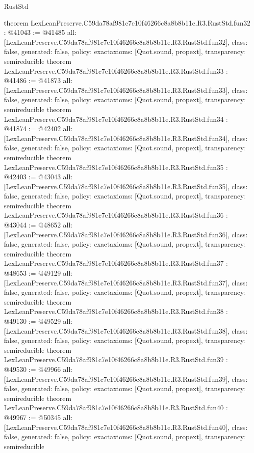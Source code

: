 \begin{lexlean}{RustStd}
\begin{coremodule}
{}
theorem LexLeanPreserve.C59da78af981c7e10f46266c8a8b8b11e.R3.RustStd.fun32 : @41043 := @41485 {
  all: [LexLeanPreserve.C59da78af981c7e10f46266c8a8b8b11e.R3.RustStd.fun32],
  class: false,
  generated: false,
  policy: exact{axioms: [Quot.sound, propext]},
  transparency: semireducible
}
theorem LexLeanPreserve.C59da78af981c7e10f46266c8a8b8b11e.R3.RustStd.fun33 : @41486 := @41873 {
  all: [LexLeanPreserve.C59da78af981c7e10f46266c8a8b8b11e.R3.RustStd.fun33],
  class: false,
  generated: false,
  policy: exact{axioms: [Quot.sound, propext]},
  transparency: semireducible
}
theorem LexLeanPreserve.C59da78af981c7e10f46266c8a8b8b11e.R3.RustStd.fun34 : @41874 := @42402 {
  all: [LexLeanPreserve.C59da78af981c7e10f46266c8a8b8b11e.R3.RustStd.fun34],
  class: false,
  generated: false,
  policy: exact{axioms: [Quot.sound, propext]},
  transparency: semireducible
}
theorem LexLeanPreserve.C59da78af981c7e10f46266c8a8b8b11e.R3.RustStd.fun35 : @42403 := @43043 {
  all: [LexLeanPreserve.C59da78af981c7e10f46266c8a8b8b11e.R3.RustStd.fun35],
  class: false,
  generated: false,
  policy: exact{axioms: [Quot.sound, propext]},
  transparency: semireducible
}
theorem LexLeanPreserve.C59da78af981c7e10f46266c8a8b8b11e.R3.RustStd.fun36 : @43044 := @48652 {
  all: [LexLeanPreserve.C59da78af981c7e10f46266c8a8b8b11e.R3.RustStd.fun36],
  class: false,
  generated: false,
  policy: exact{axioms: [Quot.sound, propext]},
  transparency: semireducible
}
theorem LexLeanPreserve.C59da78af981c7e10f46266c8a8b8b11e.R3.RustStd.fun37 : @48653 := @49129 {
  all: [LexLeanPreserve.C59da78af981c7e10f46266c8a8b8b11e.R3.RustStd.fun37],
  class: false,
  generated: false,
  policy: exact{axioms: [Quot.sound, propext]},
  transparency: semireducible
}
theorem LexLeanPreserve.C59da78af981c7e10f46266c8a8b8b11e.R3.RustStd.fun38 : @49130 := @49529 {
  all: [LexLeanPreserve.C59da78af981c7e10f46266c8a8b8b11e.R3.RustStd.fun38],
  class: false,
  generated: false,
  policy: exact{axioms: [Quot.sound, propext]},
  transparency: semireducible
}
theorem LexLeanPreserve.C59da78af981c7e10f46266c8a8b8b11e.R3.RustStd.fun39 : @49530 := @49966 {
  all: [LexLeanPreserve.C59da78af981c7e10f46266c8a8b8b11e.R3.RustStd.fun39],
  class: false,
  generated: false,
  policy: exact{axioms: [Quot.sound, propext]},
  transparency: semireducible
}
theorem LexLeanPreserve.C59da78af981c7e10f46266c8a8b8b11e.R3.RustStd.fun40 : @49967 := @50345 {
  all: [LexLeanPreserve.C59da78af981c7e10f46266c8a8b8b11e.R3.RustStd.fun40],
  class: false,
  generated: false,
  policy: exact{axioms: [Quot.sound, propext]},
  transparency: semireducible
}
\end{coremodule}
\end{lexlean}
